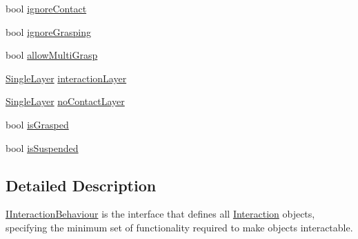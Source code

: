 \begin{DoxyCompactItemize}
\item 
bool \mbox{\hyperlink{interface_leap_1_1_unity_1_1_interaction_1_1_i_interaction_behaviour_ae619369a8370040fb52505934254f1d1}{ignore\+Contact}}
\item 
bool \mbox{\hyperlink{interface_leap_1_1_unity_1_1_interaction_1_1_i_interaction_behaviour_a347b6299054ee8ff63620cd38fe8f69b}{ignore\+Grasping}}
\item 
bool \mbox{\hyperlink{interface_leap_1_1_unity_1_1_interaction_1_1_i_interaction_behaviour_a2d40283366cf463bb4431204810579b5}{allow\+Multi\+Grasp}}
\item 
\mbox{\hyperlink{struct_leap_1_1_unity_1_1_single_layer}{Single\+Layer}} \mbox{\hyperlink{interface_leap_1_1_unity_1_1_interaction_1_1_i_interaction_behaviour_a80d7251221244b7a3092e33ae1fc6cc1}{interaction\+Layer}}
\item 
\mbox{\hyperlink{struct_leap_1_1_unity_1_1_single_layer}{Single\+Layer}} \mbox{\hyperlink{interface_leap_1_1_unity_1_1_interaction_1_1_i_interaction_behaviour_a523501b3e7d3003bebdf4283c92f97c4}{no\+Contact\+Layer}}
\item 
bool \mbox{\hyperlink{interface_leap_1_1_unity_1_1_interaction_1_1_i_interaction_behaviour_a2f4a6d4d2cddd4d05332b29e6647b6a1}{is\+Grasped}}
\item 
bool \mbox{\hyperlink{interface_leap_1_1_unity_1_1_interaction_1_1_i_interaction_behaviour_ace5ecfa7ab19c126515ad150defb6ba8}{is\+Suspended}}
\end{DoxyCompactItemize}


\subsection{Detailed Description}
\mbox{\hyperlink{interface_leap_1_1_unity_1_1_interaction_1_1_i_interaction_behaviour}{I\+Interaction\+Behaviour}} is the interface that defines all \mbox{\hyperlink{namespace_leap_1_1_unity_1_1_interaction}{Interaction}} objects, specifying the minimum set of functionality required to make objects interactable. 



